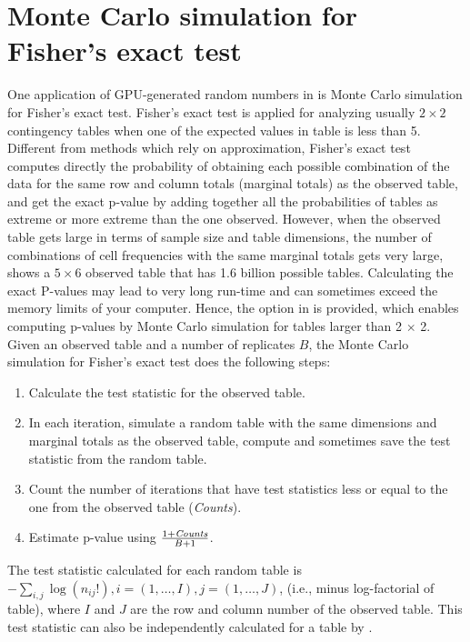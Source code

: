 \documentclass[article,nojss]{jss}\usepackage[]{graphicx}\usepackage[]{color}
\newcommand{\fct}[1]{\code{#1()}}
\begin{document}
\section{Monte Carlo simulation for Fisher's exact test}
One application of GPU-generated random numbers in  is Monte Carlo simulation for Fisher's exact test. Fisher’s exact test is applied for analyzing usually $2 \times 2$ contingency tables when one of the expected values in table is less than 5. Different from methods which rely on approximation, Fisher's exact test computes directly the probability of obtaining each possible combination of the data for the same row and column totals (marginal totals) as the observed table, and get the exact p-value by adding together all the probabilities of tables as extreme or more extreme than the one observed. However, when the observed table gets large in terms of sample size and table dimensions, the number of combinations of cell frequencies with the same marginal totals gets very large, \cite[][p. 23]{mehta2011ibm} shows a $5 \times 6$ observed table that has 1.6 billion possible tables. Calculating the exact P-values may lead to very long run-time and can sometimes exceed the memory limits of your computer. Hence, the option  in \fct{stats::fisher.test} is provided, which enables computing p-values by Monte Carlo simulation for tables larger than 2 $\times$ 2. Given an observed table and a number of replicates $B$, the Monte Carlo simulation for Fisher's exact test does the following steps: 
\begin{enumerate}
  \item Calculate the test statistic for the observed table.
	\item In each iteration, simulate a random table with the same dimensions and marginal totals as the observed table, compute and sometimes save the test statistic from the random table.
	\item Count the number of iterations that have test statistics less or equal to the one from the observed table (\emph{Counts}).
	\item Estimate p-value using $\frac{1 + \emph{Counts}}{B + 1}$.
\end{enumerate}
The test statistic calculated for each random table is $-\sum_{i,j}\log(n_{ij}!), i=(1,\dots, I), j=(1,\dots,J)$, (i.e., minus log-factorial of table), where $I$ and $J$ are the row and column number of the observed table. This test statistic can also be independently calculated for a table by \fct{gpuRandom::logfactSum}.  
\end{document}
